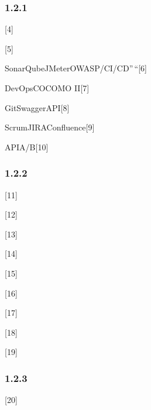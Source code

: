 \hypertarget{section-16}{%
\subsubsection{1.2.1}\label{section-16}}


{[}4{]}


{[}5{]}


SonarQubeJMeterOWASP/CI/CD''\,``{[}6{]}


DevOpsCOCOMO II{[}7{]}


GitSwaggerAPI{[}8{]}


ScrumJIRAConfluence{[}9{]}


APIA/B{[}10{]}

\hypertarget{section-17}{%
\subsubsection{1.2.2}\label{section-17}}

{[}11{]}


{[}12{]}


{[}13{]}


{[}14{]}


{[}15{]}


{[}16{]}


{[}17{]}


{[}18{]}


{[}19{]}

\hypertarget{section-18}{%
\subsubsection{1.2.3}\label{section-18}}

{[}20{]}


